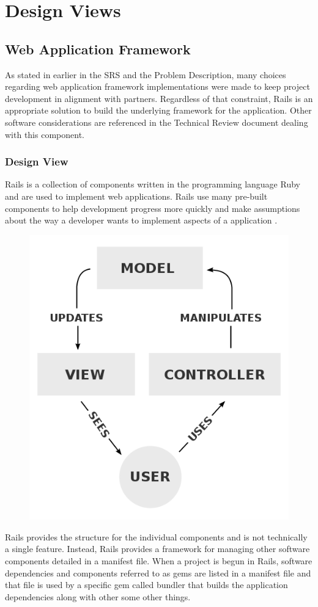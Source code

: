 \documentclass[onecolumn, draftclsnofoot,10pt, compsoc]{IEEEtran}
\begin{document}
\section{Design Views}

\subsection{Web Application Framework}
As stated in earlier in the SRS and the Problem Description, many choices regarding web application framework implementations were made to keep project development in alignment with partners. Regardless of that constraint, Rails is an appropriate solution to build the underlying framework for the application. Other software considerations are referenced in the Technical Review document dealing with this component.

\subsubsection{Design View}
Rails is a collection of components written in the programming language Ruby and are used to implement web applications. Rails use many pre-built components to help development progress more quickly and make assumptions about the way a developer wants to implement aspects of a application \cite{rails-mvc}. 
\begin{figure}
 \centering 
  \includegraphics[scale=0.4]{MVC-Process.png}\cite{mvc-image}
\end{figure}
Rails provides the structure for the individual components and is not technically a single feature. Instead, Rails provides a framework for managing other software components detailed in a manifest file. When a project is begun in Rails, software dependencies and components referred to as gems are listed in a manifest file and that file is used by a specific gem called bundler that builds the application dependencies along with other some other things. 
\end{document}

